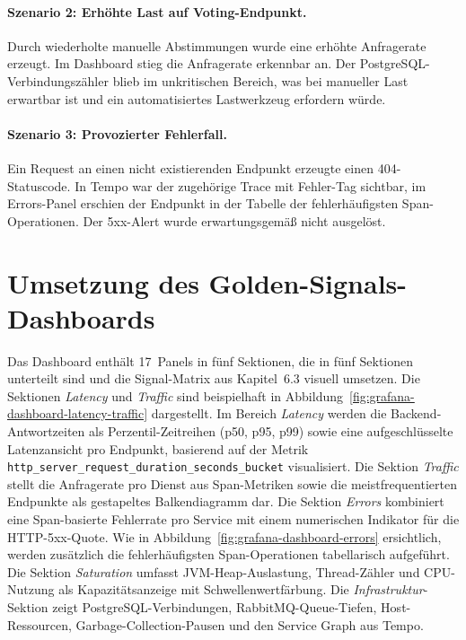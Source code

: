 \paragraph{Szenario 2: Erhöhte Last auf Voting-Endpunkt.}
Durch wiederholte manuelle Abstimmungen wurde eine erhöhte Anfragerate erzeugt. Im Dashboard stieg die Anfragerate erkennbar an. Der PostgreSQL-Verbindungszähler blieb im unkritischen Bereich, was bei manueller Last erwartbar ist und ein automatisiertes Lastwerkzeug erfordern würde.

\paragraph{Szenario 3: Provozierter Fehlerfall.}
Ein Request an einen nicht existierenden Endpunkt erzeugte einen 404-Statuscode. In Tempo war der zugehörige Trace mit Fehler-Tag sichtbar, im Errors-Panel erschien der Endpunkt in der Tabelle der fehlerhäufigsten Span-Operationen. Der 5xx-Alert wurde erwartungsgemäß nicht ausgelöst.


\section{Umsetzung des Golden-Signals-Dashboards}

Das Dashboard enthält 17~Panels in fünf Sektionen, die in fünf Sektionen unterteilt sind und die Signal-Matrix aus Kapitel~6.3 visuell umsetzen. Die Sektionen \emph{Latency} und \emph{Traffic} sind beispielhaft in Abbildung~\ref{fig:grafana-dashboard-latency-traffic} dargestellt. Im Bereich \emph{Latency} werden die Backend-Antwortzeiten als Perzentil-Zeitreihen (p50, p95, p99) sowie eine aufgeschlüsselte Latenzansicht pro Endpunkt, basierend auf der Metrik \texttt{http\_server\_request\_duration\_seconds\_bucket} visualisiert. Die Sektion \emph{Traffic} stellt die Anfragerate pro Dienst aus Span-Metriken sowie die meistfrequentierten Endpunkte als gestapeltes Balkendiagramm dar. Die Sektion \emph{Errors} kombiniert eine Span-basierte Fehlerrate pro Service mit einem numerischen Indikator für die HTTP-5xx-Quote. Wie in Abbildung~\ref{fig:grafana-dashboard-errors} ersichtlich, werden zusätzlich die fehlerhäufigsten Span-Operationen tabellarisch aufgeführt. Die Sektion \emph{Saturation} umfasst JVM-Heap-Auslastung, Thread-Zähler und CPU-Nutzung als Kapazitätsanzeige mit Schwellenwertfärbung. Die \emph{Infrastruktur}-Sektion zeigt PostgreSQL-Verbindungen, RabbitMQ-Queue-Tiefen, Host-Ressourcen, Garbage-Collection-Pausen und den Service Graph aus Tempo.

